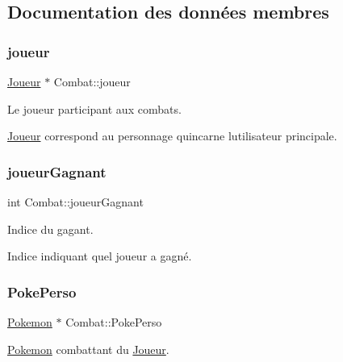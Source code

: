 \subsection{Documentation des données membres}
\mbox{\label{class_combat_adfc70215a221f8a5071f7e435719f011}} 
\subsubsection{\texorpdfstring{joueur}{joueur}}
{\footnotesize\ttfamily \hyperlink{class_joueur}{Joueur} $\ast$ Combat\+::joueur\hspace{0.3cm}{\ttfamily [private]}}



Le joueur participant aux combats. 

\hyperlink{class_joueur}{Joueur} correspond au personnage qu\textquotesingle{}incarne l\textquotesingle{}utilisateur principale. \mbox{\label{class_combat_a3eb02966f9dc1782e6314683aa784813}} 
\subsubsection{\texorpdfstring{joueur\+Gagnant}{joueurGagnant}}
{\footnotesize\ttfamily int Combat\+::joueur\+Gagnant\hspace{0.3cm}{\ttfamily [private]}}



Indice du gagant. 

Indice indiquant quel joueur a gagné. \mbox{\label{class_combat_acd7f1ec3ffd1779ea492d46189cccb47}} 
\subsubsection{\texorpdfstring{Poke\+Perso}{PokePerso}}
{\footnotesize\ttfamily \hyperlink{class_pokemon}{Pokemon} $\ast$ Combat\+::\+Poke\+Perso\hspace{0.3cm}{\ttfamily [private]}}



\hyperlink{class_pokemon}{Pokemon} combattant du \hyperlink{class_joueur}{Joueur}. 


